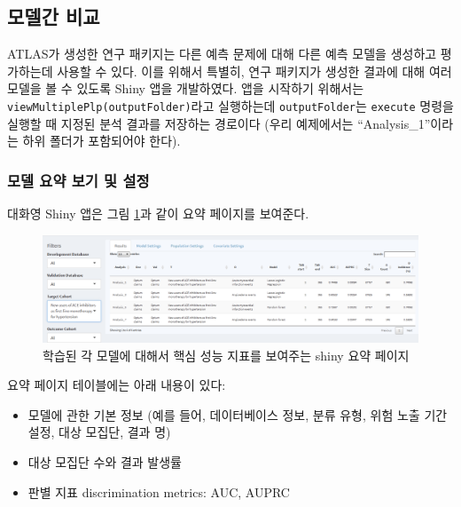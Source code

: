 \documentclass[10.5pt]{book}
\providecommand{\tightlist}{%
  \setlength{\itemsep}{0pt}\setlength{\parskip}{0pt}}
\theoremstyle{definition}
\theoremstyle{definition}
\theoremstyle{definition}
\theoremstyle{remark}
\begin{document}
\subsection{모델간 비교}\label{-}

ATLAS가 생성한 연구 패키지는 다른 예측 문제에 대해 다른 예측 모델을
생성하고 평가하는데 사용할 수 있다. 이를 위해서 특별히, 연구 패키지가
생성한 결과에 대해 여러 모델을 볼 수 있도록 Shiny 앱을 개발하였다. 앱을
시작하기 위해서는 \texttt{viewMultiplePlp(outputFolder)}라고 실행하는데
\texttt{outputFolder}는 \texttt{execute} 명령을 실행할 때 지정된 분석
결과를 저장하는 경로이다 (우리 예제에서는 ``Analysis\_1''이라는 하위
폴더가 포함되어야 한다).

\subsubsection*{모델 요약 보기 및 설정}\label{----}

대화영 Shiny 앱은 그림 \ref{fig:multiShinySummary}과 같이 요약 페이지를
보여준다.

\begin{figure}

{\centering \includegraphics[width=1\linewidth]{images/PatientLevelPrediction/shiny/shinyFilter} 

}

\caption{학습된 각 모델에 대해서 핵심 성능 지표를 보여주는 shiny 요약 페이지}\label{fig:multiShinySummary}
\end{figure}

요약 페이지 테이블에는 아래 내용이 있다:

\begin{itemize}
\tightlist
\item
  모델에 관한 기본 정보 (예를 들어, 데이터베이스 정보, 분류 유형, 위험
  노출 기간 설정, 대상 모집단, 결과 명)
\item
  대상 모집단 수와 결과 발생률
\item
  판별 지표 discrimination metrics: AUC, AUPRC
\end{itemize}
\end{document}
